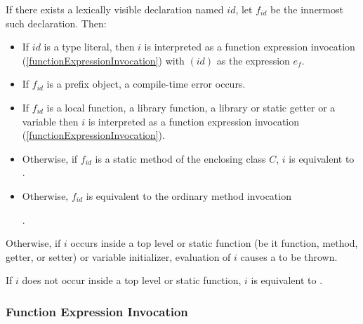 \documentclass{article}
\begin{document}
\LMHash{}
If there exists a lexically visible declaration named $id$, let $f_{id}$ be the innermost such declaration.
Then:
\begin{itemize}
\item
If $id$ is a type literal, then $i$ is interpreted as a function expression invocation (\ref{functionExpressionInvocation}) with $(id)$ as the expression $e_f$.
\item
If $f_{id}$ is a prefix object, a compile-time error occurs.
\item
If $f_{id}$ is a local function, a library function, a library or static getter or a variable then $i$ is interpreted as a function expression invocation (\ref{functionExpressionInvocation}).
\item
Otherwise, if $f_{id}$ is a static method of the enclosing class $C$, $i$ is equivalent to
.
\item Otherwise, $f_{id}$ is equivalent to the ordinary method invocation

.
\end{itemize}

\LMHash{}
Otherwise, if $i$ occurs inside a top level or static function (be it function, method, getter, or setter) or variable initializer, evaluation of $i$ causes a  to be thrown.

\LMHash{}
If $i$ does not occur inside a top level or static function, $i$ is equivalent to
.



\subsubsection{Function Expression Invocation}
\end{document}
